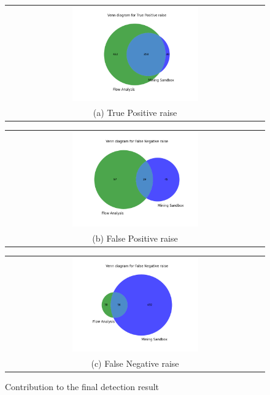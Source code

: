 \begin{figure}[t!]
  \centering
  \begin{tabular}{@{}c@{}}
    \includegraphics[width=0.5\textwidth]{image/vennTP.png} \\[\abovecaptionskip]
    \small (a) True Positive raise
  \end{tabular}

  \begin{tabular}{@{}c@{}}
    \includegraphics[width=0.5\textwidth]{image/vennFP.png} \\[\abovecaptionskip]
    \small (b) False Positive raise
  \end{tabular}
   \begin{tabular}{@{}c@{}}
    \includegraphics[width=0.5\textwidth]{image/vennFN.png} \\[\abovecaptionskip]
    \small (c) False Negative raise
  \end{tabular}

  \caption{Contribution to the final detection result}\label{fig:venn}
\end{figure}



